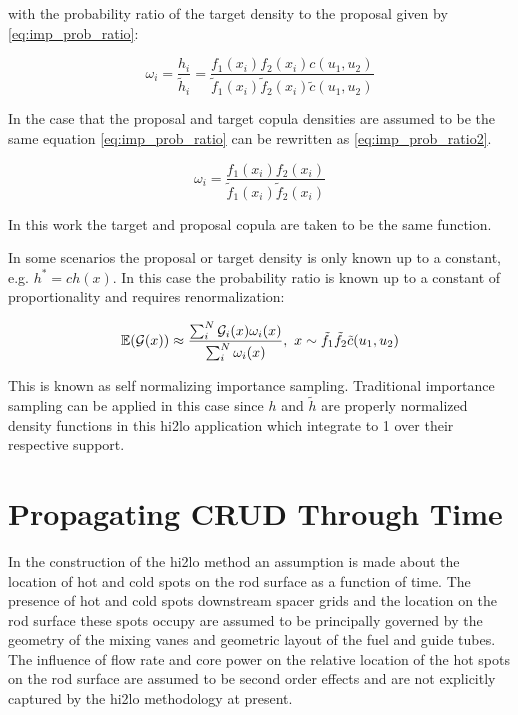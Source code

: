 with the probability ratio of the target density to the proposal given by \ref{eq:imp_prob_ratio}:

\begin{equation}
\omega_i = \frac{h_i}{\tilde h_i} = \frac{f_1(x_i) f_2(x_i)c(u_1, u_2)}{\tilde f_1(x_i) \tilde f_2(x_i) \tilde c(u_1, u_2)}
\label{eq:imp_prob_ratio}
\end{equation}

In the case that the proposal and target copula densities are assumed to be the same equation \ref{eq:imp_prob_ratio} can be rewritten as \ref{eq:imp_prob_ratio2}.

\begin{equation}
\omega_i = \frac{f_1(x_i) f_2(x_i)}{\tilde f_1(x_i) \tilde f_2(x_i)}
\label{eq:imp_prob_ratio2}
\end{equation}

In this work the target and proposal copula are taken to be the same function.

In some scenarios the proposal or target density is only known up to a constant, e.g. $h^* = c h(x)$.  In this case the probability ratio is known up to a constant of proportionality and requires renormalization: 

\begin{equation}
\operatorname*{\mathbb{E}}(\mathcal G(x)) \approx \frac{ \sum_i^N \mathcal G_i(x) \omega_i(x)}{\sum_i^N \omega_i(x)}
,
 \ x \sim \tilde{f_1} \tilde f_2 \tilde c(u_1, u_2)
\end{equation}

This is known as self normalizing importance sampling.  Traditional importance sampling can be applied in this case since $h$ and $\tilde{h}$ are properly normalized density functions in this hi2lo application which integrate to 1 over their respective support.


\section{Propagating CRUD Through Time}

In the construction of the hi2lo method an assumption is made about the location of hot and cold spots on the rod surface as a function of time.   The presence of hot and cold spots downstream spacer grids and the location on the rod surface these spots occupy are assumed to be principally governed by the geometry of the mixing vanes and geometric layout of the fuel and guide tubes.  The influence of flow rate and core power on the relative location of the hot spots on the rod surface are assumed to be second order effects and are not explicitly captured by the hi2lo methodology at present.

